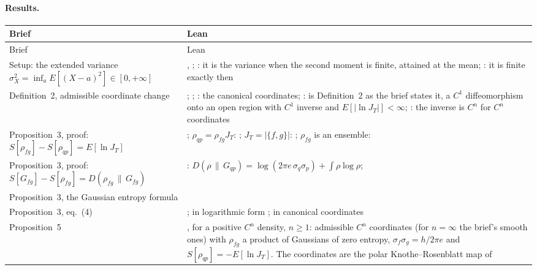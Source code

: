 \documentclass[11pt]{article}
\begin{document}
\paragraph{Results.}
\begin{xltabular}{\textwidth}{@{}BL@{}}
\toprule
Brief & Lean \\
\midrule
\endfirsthead
\toprule
Brief & Lean \\
\midrule
\endhead
\bottomrule
\endlastfoot
Setup: the extended variance $\sigma_X^2 = \inf_a E[(X - a)^2] \in [0, +\infty]$ &
  , ; : it is the variance
  when the second moment is finite, attained at the mean; : it is
  finite exactly then \\
Definition~2, admissible coordinate change & ;
  ; : the canonical coordinates;
  :  is Definition~2 as the brief states it, a $C^1$
  diffeomorphism onto an open region with $C^1$ inverse and $E[|\ln J_T|] < \infty$;
  : the inverse is $C^n$ for $C^n$
  coordinates \\
Proposition~3, proof: $S[\rho_{fg}] - S[\rho_{qp}] = E[\ln J_T]$ &
  ; $\rho_{qp} = \rho_{fg}J_T$:
  ; $J_T = |\{f, g\}|$: ;
  $\rho_{fg}$ is an ensemble:  \\
Proposition~3, proof: $S[G_{fg}] - S[\rho_{fg}] = D(\rho_{fg}\,\|\,G_{fg})$ &
  : $D(\rho\,\|\,G_{qp}) = \log(2\pi e\,\sigma_q\sigma_p) +
  \int\rho\log\rho$;  \\
Proposition~3, the Gaussian entropy formula &  \\
Proposition~3, eq.~(4) & ; in logarithmic form
  ; in canonical coordinates
   \\
Proposition~5 & , for a positive $C^n$
  density, $n \ge 1$: admissible $C^n$ coordinates (for $n = \infty$ the brief's smooth ones)
  with $\rho_{fg}$ a product of Gaussians of zero entropy,
  $\sigma_f\sigma_g = h/2\pi e$ and $S[\rho_{qp}] = -E[\ln J_T]$. The coordinates are the polar
  Knothe--Rosenblatt map of 

\end{xltabular}
\end{document}
